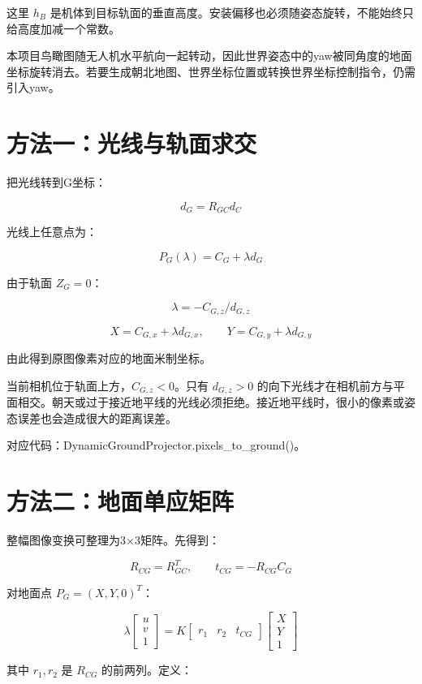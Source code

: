 \documentclass[UTF8,a4paper,11pt,fontset=windows]{ctexart}
\begin{document}
这里 \(h_B\) 是机体到目标轨面的垂直高度。安装偏移也必须随姿态旋转，不能始终只给高度加减一个常数。


本项目鸟瞰图随无人机水平航向一起转动，因此世界姿态中的yaw被同角度的地面坐标旋转消去。若要生成朝北地图、世界坐标位置或转换世界坐标控制指令，仍需引入yaw。


\section{方法一：光线与轨面求交}

把光线转到G坐标：


\[
d_G=R_{GC}d_C
\]

光线上任意点为：


\[
P_G(\lambda)=C_G+\lambda d_G
\]

由于轨面 \(Z_G=0\)：


\[
\lambda=-C_{G,z}/d_{G,z}
\]

\[
X=C_{G,x}+\lambda d_{G,x},\qquad
Y=C_{G,y}+\lambda d_{G,y}
\]

由此得到原图像素对应的地面米制坐标。


当前相机位于轨面上方，\(C_{G,z}<0\)。只有 \(d_{G,z}>0\) 的向下光线才在相机前方与平面相交。朝天或过于接近地平线的光线必须拒绝。接近地平线时，很小的像素或姿态误差也会造成很大的距离误差。


对应代码：DynamicGroundProjector.pixels\_to\_ground()。


\section{方法二：地面单应矩阵}

整幅图像变换可整理为3×3矩阵。先得到：


\[
R_{CG}=R_{GC}^{T},\qquad t_{CG}=-R_{CG}C_G
\]

对地面点 \(P_G=(X,Y,0)^T\)：


\[
\lambda\begin{bmatrix}u\\v\\1\end{bmatrix}
=
K\begin{bmatrix}r_1&r_2&t_{CG}\end{bmatrix}
\begin{bmatrix}X\\Y\\1\end{bmatrix}
\]

其中 \(r_1,r_2\) 是 \(R_{CG}\) 的前两列。定义：
\end{document}
